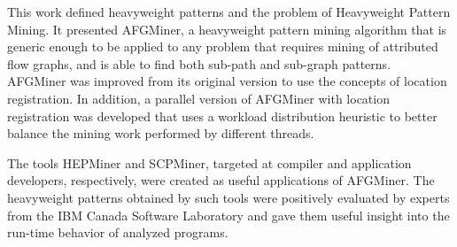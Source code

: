 This work defined heavyweight patterns and the problem of Heavyweight Pattern Mining. It presented AFGMiner, a heavyweight pattern mining algorithm that is generic enough to be applied to any problem that requires mining of attributed flow graphs, and is able
to find both sub-path and sub-graph patterns. AFGMiner was improved from its original version to use the concepts of location registration. In addition, a parallel version of AFGMiner with location registration was developed that uses a workload distribution heuristic to better balance the mining work performed by different threads.

The tools HEPMiner and SCPMiner, targeted at compiler and application developers, respectively, were created as useful applications of AFGMiner. The heavyweight patterns obtained by such tools were positively evaluated by experts from the IBM Canada Software Laboratory and gave them useful insight into the run-time behavior of analyzed programs.

